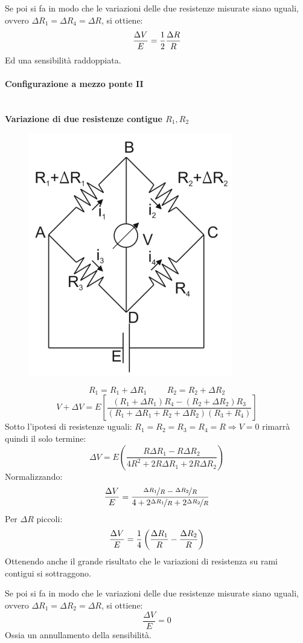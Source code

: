 \documentclass[a4paper, 15pt]{article}
\begin{document}
\begin{adjustwidth}{2in}{}
		Se poi si fa in modo che le variazioni delle due resistenze misurate siano uguali, ovvero $\Delta R_1 = \Delta R_4 = \Delta R$, si ottiene:
		\[\dfrac{\Delta V}{E} = {1\over2}\dfrac{\Delta R}{R}\]
		Ed una sensibilità raddoppiata.  
		
		\paragraph{Configurazione a mezzo ponte II} \mbox{} \\
		\textbf{Variazione di due resistenze contigue $R_1, R_2$}
			\begin{figure}[H]
				\centering
				\includegraphics[width=0.3\linewidth]{fig/screenshot017}
				\label{fig:screenshot017}
			\end{figure}				
		\[R_1 = R_1 + \Delta R_1 \hspace{1cm} R_2 = R_2 + \Delta R_2 \]
		\[V+\Delta V = E\left[\dfrac{(R_1+ \Delta R_1)R_4-(R_2 + \Delta R_2)R_3}{(R_1+ \Delta R_1+R_2 + \Delta R_2)(R_3+R_4)}\right]\]
		Sotto l'ipotesi di resistenze uguali: $R_1=R_2=R_3=R_4=R\Rightarrow V=0$ rimarrà quindi il solo termine:
		\[\Delta V = E\left(\dfrac{R\Delta R_1 - R\Delta R_2}{4R^2 + 2R\Delta R_1+2R\Delta R_2}\right)\]
		Normalizzando: 
		\[\dfrac{\Delta V}{E} = \dfrac{\nicefrac{\Delta R_1}{R} - \nicefrac{\Delta R_2}{R}}{4+2\nicefrac{\Delta R_1}{R} + 2\nicefrac{\Delta R_2}{R}}\]
		Per $\Delta R$ piccoli:
		\[\dfrac{\Delta V}{E} = {1\over4}\left(\dfrac{\Delta R_1}{R} - \dfrac{\Delta R_2}{R}\right)\]
		Ottenendo anche il grande risultato che le variazioni di resistenza su rami contigui si sottraggono. 
		
		Se poi si fa in modo che le variazioni delle due resistenze misurate siano uguali, ovvero $\Delta R_1 = \Delta R_2 = \Delta R$, si ottiene:
		\[\dfrac{\Delta V}{E} = 0\]
		Ossia un annullamento della sensibilità. 
\newpage		

\end{adjustwidth}
\end{document}
